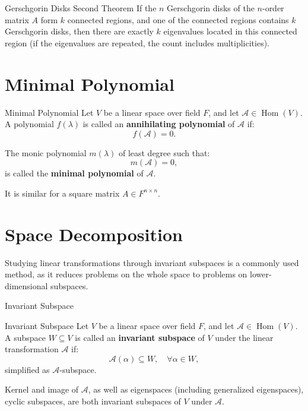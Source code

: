 \documentclass[11pt]{../../TexTemplate/elegantbook} %
\begin{document}
\begin{theorem}{Gerschgorin Disks Second Theorem}
    If the \(n\) Gerschgorin disks of the \(n\)-order matrix \(A\) form \(k\) connected regions,
    and one of the connected regions contains \(k\) Gerschgorin disks, 
    then there are exactly \(k\) eigenvalues located in this connected region (if the eigenvalues are repeated, 
    the count includes multiplicities).
\end{theorem}

\section{Minimal Polynomial}
\begin{definition}{Minimal Polynomial}
    Let \( V \) be a linear space over field \( F \), 
    and let \( \mathcal{A}\in \operatorname{Hom}(V) \).
    A polynomial \( f(\lambda) \) is called an \textbf{annihilating polynomial} of \( \mathcal{A} \) if:
    \[
    f(\mathcal{A}) = 0.
    \]

    The monic polynomial \( m(\lambda) \) of least degree such that:
    \[
    m(\mathcal{A}) = 0,
    \]
    is called the \textbf{minimal polynomial} of \( \mathcal{A} \).

    It is similar for a square matrix \( A \in F^{n \times n} \).
\end{definition}

\section{Space Decomposition}
Studying linear transformations through invariant subspaces is a commonly used method, 
as it reduces problems on the whole space to problems on lower-dimensional subspaces.
\begin{leftbarTitle}{Invariant Subspace}\end{leftbarTitle}
\begin{definition}{Invariant Subspace}
    Let \( V \) be a linear space over field \( F \), 
    and let \( \mathcal{A}\in \operatorname{Hom}(V) \).
    A subspace \( W \subseteq V \) is called an \textbf{invariant subspace} of \( V \)
    under the linear transformation \( \mathcal{A} \) if:
    \[
    \mathcal{A}(\alpha) \subseteq W, \quad \forall \alpha \in W,
    \]
    simplified as \( \mathcal{A} \)-subspace.
\end{definition}

\begin{remark}
    Kernel and image of \( \mathcal{A} \),
    as well as eigenspaces (including generalized eigenspaces), cyclic subspaces,
    are both invariant subspaces of \( V \) under \( \mathcal{A} \).
\end{remark}
\end{document}

